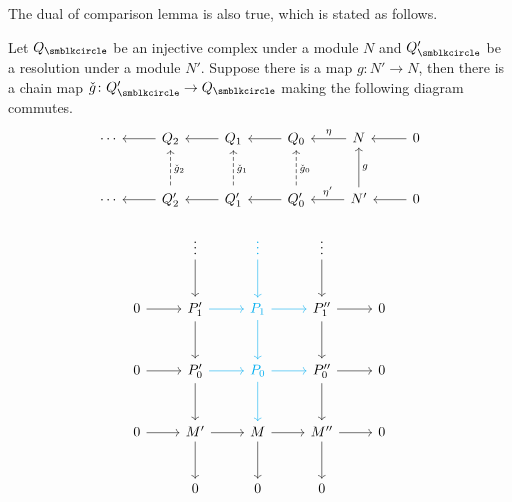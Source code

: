 The dual of comparison lemma is also true, which is stated as follows.

\begin{lemma}
  Let $Q_\CCCIR$ be an injective complex under a module $N$ and $Q_\CCCIR'$ be a resolution under a module $N'$. Suppose there is a map $g\colon N'\to N$, then there is a chain map $\check g\colon Q_\CCCIR'\to Q_\CCCIR$ making the following diagram commutes.
  \begin{equation*}
    \begin{tikzcd}[row sep=large]
      \dotsb & Q_2 & Q_1 & Q_0 & N & 0\\
      \dotsb & Q_2' & Q_1' & Q_0' & N' & 0
      \arrow[from=1-1,leftarrow]{1-2}[]{}
      \arrow[from=1-2,leftarrow]{1-3}[]{}
      \arrow[from=1-3,leftarrow]{1-4}[]{}
      \arrow[from=1-4,leftarrow]{1-5}[]{\eta}
      \arrow[from=1-5,leftarrow]{1-6}[]{}
      \arrow[from=2-1,leftarrow]{2-2}[]{}
      \arrow[from=2-2,leftarrow]{2-3}[]{}
      \arrow[from=2-3,leftarrow]{2-4}[]{}
      \arrow[from=2-4,leftarrow]{2-5}[]{\eta'}
      \arrow[from=2-5,leftarrow]{2-6}[]{}
      \arrow[from=1-2,dashed,leftarrow]{2-2}[]{\check{g}_2}
      \arrow[from=1-3,dashed,leftarrow]{2-3}[]{\check{g}_1}
      \arrow[from=1-4,dashed,leftarrow]{2-4}[]{\check{g}_0}
      \arrow[from=1-5,leftarrow]{2-5}[]{g}
    \end{tikzcd}
  \end{equation*}
\end{lemma}

\begin{lemma}
  \begin{equation*}
    \begin{tikzcd}[row sep=large]
      & \vdots & \color{cyan}\vdots & \vdots\\
      0 & P_1' & \color{cyan}P_1 & P_1'' & 0\\
      0 & P_0' & \color{cyan}P_0 & P_0'' & 0\\
      0 & M' & M & M'' & 0\\
      & 0 & 0 & 0
      \arrow[from=4-1,]{4-2}[]{}
      \arrow[from=4-2,]{4-3}[]{}
      \arrow[from=4-3,]{4-4}[]{}
      \arrow[from=4-4,]{4-5}[]{}
      \arrow[from=1-2,]{2-2}[]{}
      \arrow[from=2-2,]{3-2}[]{}
      \arrow[from=3-2,]{4-2}[]{}
      \arrow[from=4-2,]{5-2}[]{}
      \arrow[from=1-4,]{2-4}[]{}
      \arrow[from=2-4,]{3-4}[]{}
      \arrow[from=3-4,]{4-4}[]{}
      \arrow[from=4-4,]{5-4}[]{}
      \arrow[from=1-3,cyan,]{2-3}[]{}
      \arrow[from=2-3,cyan,]{3-3}[]{}
      \arrow[from=3-3,cyan,]{4-3}[]{}
      \arrow[from=4-3,]{5-3}[]{}
      \arrow[from=3-1,]{3-2}[]{}
      \arrow[from=3-2,cyan,]{3-3}[]{}
      \arrow[from=3-3,cyan,]{3-4}[]{}
      \arrow[from=3-4,]{3-5}[]{}
      \arrow[from=2-1,]{2-2}[]{}
      \arrow[from=2-2,cyan,]{2-3}[]{}
      \arrow[from=2-3,cyan,]{2-4}[]{}
      \arrow[from=2-4,]{2-5}[]{}
    \end{tikzcd}
  \end{equation*}
\end{lemma}

